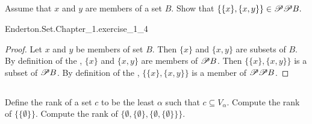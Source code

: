 \documentclass{report}
\begin{document}
\subsection{}%

  Assume that $x$ and $y$ are members of a set $B$.
  Show that $\{\{x\}, \{x, y\}\} \in \mathscr{P}\mathscr{P}B.$

    {Enderton.Set.Chapter\_1.exercise\_1\_4}

  \begin{proof}
    Let $x$ and $y$ be members of set $B$.
    Then $\{x\}$ and $\{x, y\}$ are subsets of $B$.
    By definition of the , $\{x\}$ and $\{x, y\}$ are
      members of $\mathscr{P}B$.
    Then $\{\{x\}, \{x, y\}\}$ is a subset of $\mathscr{P}B$.
    By definition of the , $\{\{x\}, \{x, y\}\}$ is a
      member of $\mathscr{P}\mathscr{P}B$.
  \end{proof}

\subsection{}%

  Define the rank of a set $c$ to be the least $\alpha$ such that
    $c \subseteq V_\alpha$.
  Compute the rank of $\{\{\emptyset\}\}$.
  Compute the rank of
    $\{\emptyset, \{\emptyset\}, \{\emptyset, \{\emptyset\}\}\}$.
\end{document}
